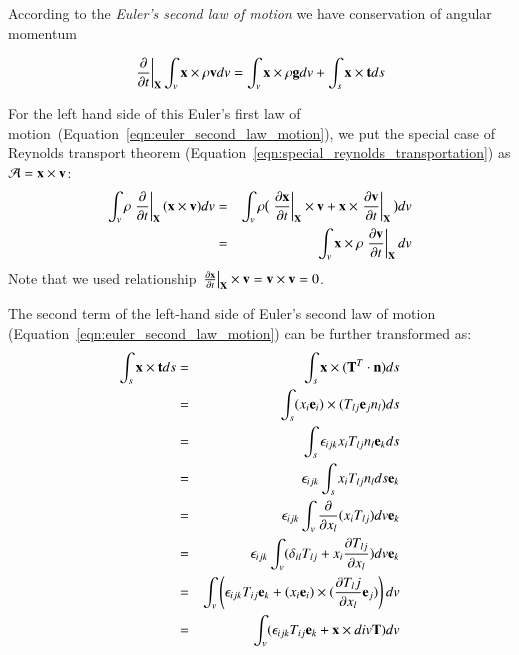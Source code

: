 According to the \emph{Euler's second law of motion} we have conservation of angular momentum
%
\begin{tcolorbox}[title=Euler's second law of motion]
\begin{eqnarray}
\label{eqn:euler_second_law_motion}
\left.\frac{\partial}{\partial{t}}\right |_{\mathbf{X}} \int_v \mathbf{x} \times \rho \mathbf{v} dv
=	\int_v \mathbf{x} \times \rho \mathbf{g} dv	
+ \int_s {\mathbf{x}} \times {\mathbf{t}} ds
\end{eqnarray}
\end{tcolorbox}
%
For the left hand side of this Euler's first law of motion~(Equation~\eqref{eqn:euler_second_law_motion}), we put the special case of Reynolds transport theorem (Equation~\eqref{eqn:special_reynolds_transportation}) as $\mathcal{A}={\mathbf{x}}\times{\mathbf{v}}$:
%
\begin{eqnarray}
\int_v \rho \left.\frac{\partial}{\partial{t}}\right|_{\mathbf{X}} ( {\mathbf{x}} \times {\mathbf{v}} ) dv
&=&\int_v \rho \big( \left.\frac{\partial\mathbf{x}}{\partial{t}}\right|_{\mathbf{X}} \times {\mathbf{v}} + {\mathbf{x}}\times\left.\frac{\partial\mathbf{v}}{\partial{t}}\right|_{\mathbf{X}} \big) dv \\
&=&\int_v {\mathbf{x}} \times \rho \left.\frac{\partial\mathbf{v}}{\partial{t}}\right|_{\mathbf{X}}  dv 
\end{eqnarray}
%
Note that we used relationship $\left.\frac{\partial\mathbf{x}}{\partial{t}}\right|_{\mathbf{X}}\times{\mathbf{v}}={\mathbf{v}}\times{\mathbf{v}}=0$.


The second term of the left-hand side of Euler's second law of motion (Equation~\eqref{eqn:euler_second_law_motion}) can be further transformed as:
%
\begin{eqnarray}
\int_s {\mathbf{x}} \times {\mathbf{t}} ds
&=&\int_s {\mathbf{x}} \times ( {\mathbf{T}^T} \cdot {\mathbf{n}} ) ds\\
&=&\int_s (x_i{\mathbf{e}_i}) \times ( T_{lj} {\mathbf{e}_j} n_l ) ds\\
&=&\int_s {\epsilon_{ijk}} x_i T_{lj} n_l {\mathbf{e}_k} ds\\
&=&{\epsilon_{ijk}} \int_s x_i T_{lj} n_l ds {\mathbf{e}_k}\\
&=&{\epsilon_{ijk}} \int_v \frac{\partial}{\partial{x_l}} ( x_i T_{lj} ) dv {\mathbf{e}_k}\\
&=&{\epsilon_{ijk}} \int_v ( \delta_{il} T_{lj} + x_i \frac{\partial{T_{lj}}}{\partial{x_l}} ) dv {\mathbf{e}_k}\\
&=&\int_v \left( {\epsilon_{ijk}}T_{ij}{\mathbf{e}_k} + ({x_i}{\mathbf{e}_i})\times(\frac{\partial{T_lj}}{\partial{x_l}}{\mathbf{e}_j}) \right) dv\\
&=&\int_v ({\epsilon_{ijk}}T_{ij}{\mathbf{e}_k} + {\mathbf{x}} \times div{\mathbf{T}} ) dv 
\end{eqnarray}

